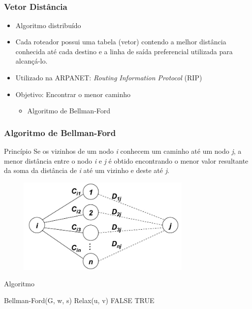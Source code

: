 \documentclass{beamer}
\begin{document}
\subsection{}

\begin{frame}
\frametitle{Vetor Distância}
\begin{itemize}
  \setlength{\itemsep}{0.7cm}%
  \item Algoritmo distribuído
  \item Cada roteador possui uma tabela (vetor) contendo a melhor distância conhecida até cada destino e a linha de saída preferencial utilizada para alcançá-lo.
  \item Utilizado na ARPANET: \emph{Routing Information Protocol} (RIP)
  \item Objetivo: Encontrar o menor caminho
  \begin{itemize}
    \item Algoritmo de Bellman-Ford
  \end{itemize}
\end{itemize}
\end{frame}

\begin{frame}
\frametitle{Algoritmo de Bellman-Ford}
\begin{block}{Princípio}
Se os vizinhos de um nodo \emph{i} conhecem um caminho até um nodo \emph{j}, a menor distância
entre o nodo \emph{i} e \emph{j} é obtido encontrando o menor valor resultante
da soma da distância de \emph{i} até um vizinho e deste até \emph{j}.
\end{block}
\begin{figure}[htp]
\begin{center}
  \includegraphics[width=85mm]{Imagens/BellmanFord.jpeg}
  \label{bellman_ford}
\end{center}
\end{figure}
\end{frame}

\begin{frame}
\begin{block}{Algoritmo}
\begin{algorithmic}
    \STATE Bellman-Ford(G, w, s)
    		\STATE Relax(u, v)
    	\ENDFOR
    \ENDFOR 
    		\RETURN FALSE
    	\ENDIF
   	\ENDFOR
   	\RETURN TRUE
\end{algorithmic}
\end{block}
\end{frame}
\end{document}
